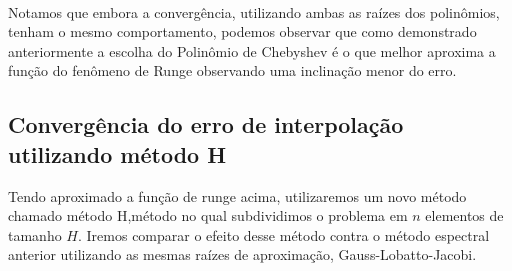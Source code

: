 \\
Notamos que embora a convergência, utilizando ambas as raízes dos polinômios, tenham o mesmo comportamento, podemos observar que como demonstrado  anteriormente a escolha do Polinômio de Chebyshev é o que melhor aproxima a função do fenômeno de Runge observando uma inclinação menor do erro.

\subsection{Convergência do erro de interpolação utilizando método H}
 Tendo aproximado a função de runge acima, utilizaremos um novo método chamado método H,método no qual subdividimos o problema em $n$ elementos de tamanho $H$. Iremos comparar o efeito desse método contra o método espectral anterior utilizando as mesmas raízes de aproximação, Gauss-Lobatto-Jacobi.

